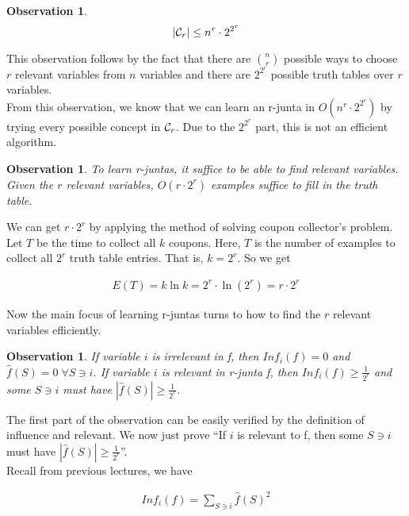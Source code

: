 \documentclass[12pt]{article}
\newtheorem{observation}[theorem]{Observation}
\newcommand{\calc}{{\cal C}}
\begin{document}
\begin{observation}
\begin{equation*}
|\calc_r| \le n^r \cdot 2^{2^r}
\end{equation*}
\end{observation}

This observation follows by the fact that there are $\binom {n}{r}$
possible ways to choose $r$ relevant variables from $n$ variables and
there are $2^{2^r}$ possible truth tables over $r$ variables. \\

From this observation, we know that we can learn an r-junta in $O(n^r
\cdot 2^{2^r})$ by trying every possible concept in $\calc_r$. Due
to the $2^{2^r}$ part, this is not an efficient algorithm.

\begin{observation}
To learn r-juntas, it suffice to be able to find relevant
variables. Given the $r$ relevant variables, $O(r \cdot 2^r)$ examples
suffice to fill in the truth table.
\end{observation}

We can get $r \cdot 2^r$ by applying the method of solving coupon
collector's problem. Let $T$ be the time to collect all $k$
coupons. Here, $T$ is the number of examples to collect all
$2^r$ truth table entries. That is, $k = 2^r$. So we get

\begin{eqnarray*}
E(T) = k \ln k = 2^r \cdot \ln (2^r) = r \cdot 2^r
\end{eqnarray*}

Now the main focus of learning r-juntas turns to how to find the $r$
relevant variables efficiently.

\begin{observation} \label{observation:rel}
If variable $i$ is irrelevant in f, then $Inf_i(f) = 0$ and $\hat
{f}(S) = 0 \; \forall S \ni i$. If variable $i$ is relevant in r-junta
f, then $Inf_i(f) \ge \frac {1}{2^r}$ and some $S \ni i$ must have
$|\hat {f}(S)| \ge \frac {1}{2^r}$.
\end{observation}

The first part of the observation can be easily verified by the
definition of influence and relevant. We now just prove ``If $i$ is
relevant to f, then some $S \ni i$ must have $|\hat {f}(S)| \ge \frac
{1}{2^r}$''. \\

Recall from previous lectures, we have

\begin{eqnarray*}
Inf_i(f) = \sum_{S \ni i} \hat {f}(S)^2
\end{eqnarray*}
\end{document}
